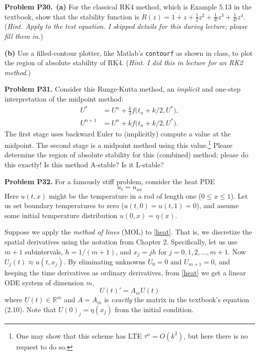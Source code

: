 \documentclass[12pt]{amsart}
\newcommand{\RR}{\mathbb{R}}
\newcommand{\prob}[1]{\bigskip\noindent\textbf{#1}\quad }
\newcommand{\epart}[1]{\medskip\noindent\textbf{(#1)}\quad }
\newcommand{\ppart}[1]{\,\textbf{(#1)}\quad }
\begin{document}
\prob{Problem P30.}  \ppart{a}  For the classical RK4 method, which is Example 5.13 in the textbook, show that the stability function is $R(z) = 1 + z + \frac{1}{2} z^2 + \frac{1}{3!} z^3 + \frac{1}{4!} z^4$.  (\emph{Hint.  Apply to the test equation.  I skipped details for this during lecture; please fill them in.})

\epart{b}  Use a filled-contour plotter, like Matlab's \texttt{contourf} as shown in class, to plot the region of absolute stability of RK4.  (\emph{Hint.  I did this in lecture for an RK2 method.})


\prob{Problem P31.}  Consider this Runge-Kutta method, an \emph{implicit} and one-step interpretation of the midpoint method:
\begin{align*}
U^* &= U^n + \frac{k}{2} f\big(t_n + k/2, U^*\big),\\
U^{n+1} &= U^n + k f\big(t_n + k/2, U^*\big).
\end{align*}
The first stage uses backward Euler to (implicitly) compute a value at the midpoint.  The second stage is a midpoint method using this value.\footnote{One may show that this scheme has LTE $\tau^n = O(k^2)$, but here there is no request to do so.}  Please determine the region of absolute stability for this (combined) method; please do this exactly!  Is this method A-stable?  Is it L-stable?


\prob{Problem P32.}  For a famously stiff problem, consider the heat PDE
\begin{equation}
u_t = u_{xx}  \label{heat}
\end{equation}
Here $u(t,x)$ might be the temperature in a rod of length one ($0 \le x \le 1$).  Let us set boundary temperatures to zero ($u(t,0)=u(t,1)=0$), and assume some initial temperature distribution $u(0,x)=\eta(x)$.

Suppose we apply the \emph{method of lines} (MOL) to \eqref{heat}.  That is, we discretize the spatial derivatives using the notation from Chapter 2.  Specifically, let us use $m+1$ subintervals, $h=1/(m+1)$, and $x_j = j h$ for $j=0,1,2,\dots,m+1$.  Now $U_j(t) \approx u(t,x_j)$.  By eliminating unknowns $U_0=0$ and $U_{m+1}=0$, and keeping the time derivatives as ordinary derivatives, from \eqref{heat} we get a linear ODE system of dimension $m$,
\begin{equation}
U(t)' = A_m U(t)  \label{mol}
\end{equation}
where $U(t) \in \RR^m$ and $A=A_m$ is \emph{exactly} the matrix in the textbook's equation (2.10).  Note that $U(0)_j = \eta(x_j)$ from the initial condition.
\end{document}
